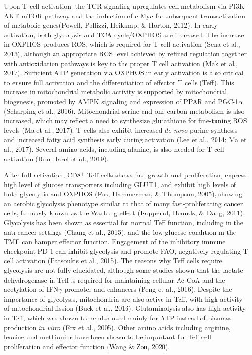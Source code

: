 \documentclass[12pt,twoside,openany,\mydriver]{thesis}  %
\begin{document}
Upon T cell activation, the TCR signaling upregulates cell metabolism via PI3K-AKT-mTOR pathway and the induction of c-Myc for subsequent transactivation of metabolic genes(Powell, Pollizzi, Heikamp, \& Horton, 2012). In early activation, both glycolysis and TCA cycle/OXPHOS are increased. The increase in OXPHOS produces ROS, which is required for T cell activation (Sena et al., 2013), although an appropriate ROS level achieved by refined regulation together with antioxidation pathways is key to the proper T cell activation (Mak et al., 2017). Sufficient ATP generation via OXPHOS in early activation is also critical to ensure full activation and the differentiation of effector T cells (Teff). This increase in mitochondrial metabolic activity is supported by mitochondrial biogenesis, promoted by AMPK signaling and expression of PPAR and PGC-1\(\alpha\) (Scharping et al., 2016). Mitochondrial serine and one-carbon metabolism is also increased, which may reflect a need to synthesize glutathione for fine-tuning ROS levels (Ma et al., 2017). T cells also exhibit increased \emph{de novo} purine synthesis and increased fatty acid synthesis early during activation (Lee et al., 2014; Ma et al., 2017). Several amino acids, including alanine, is also needed for T cell activation (Ron-Harel et al., 2019).

After full activation, CD8\(^+\) Teff cells shows fast growth and proliferation, express high level of glucose transporters including GLUT1, and exhibit high levels of both glycolysis and OXPHOS (Fox, Hammerman, \& Thompson, 2005), showing an aerobic glycolysis phenotype similar to that of many fast-proliferating cancer cells, famously known as the Warburg effect (Koppenol, Bounds, \& Dang, 2011). Glycolysis has been shown as essential for normal Teff function, including in the anti-cancer settings (Chang et al., 2015), and the low-glucose condition in the TME can hamper effector function. Engagement of the inhibitory immune checkpoint PD-1 can inhibit glycolysis and promote FAO, negatively regulating T cell activation (Patsoukis et al., 2015). The reasons why Teff cells require glycolysis are not fully elucidated, although some studies shown that the lactate dehydrogenase in Teff is required for maintaining cellular Ac-CoA and the acetylation of IFN\(\gamma\) promoter and enhancers (Peng et al., 2016). Despite the importance of glycolysis, mitochondria are also active in Teff, with high activity of mitochondrial fission (Buck et al., 2016). Glutaminolysis also has high activity in Teff, which was shown to be also used mainly for ATP instead of biomass production \emph{in vitro} (Fox et al., 2005). Other amino acids including arginine, leucine and methionine have been shown to be important for Teff cell proliferation and effector function (Wang \& Zou, 2020).
\end{document}
